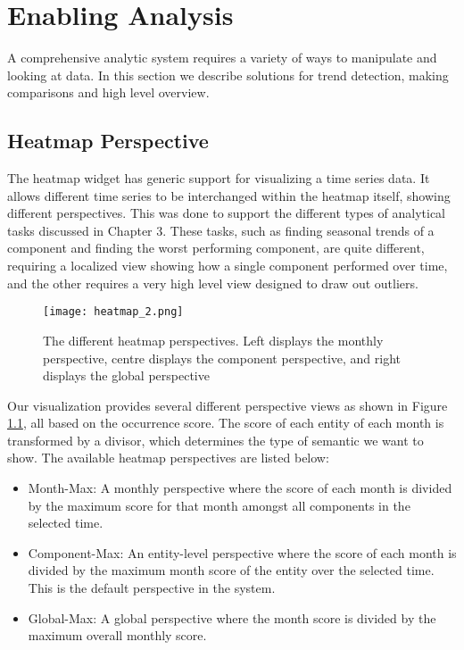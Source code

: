 %
\chapter{Enabling Analysis}
A comprehensive analytic system requires a variety of ways to manipulate and
looking at data. In this section we describe solutions for trend detection,
making comparisons and high level overview.
 

\section{Heatmap Perspective}
The heatmap widget has generic support for visualizing a time series data. It 
allows different time series to be interchanged within the heatmap itself, showing 
different perspectives. This was done to support the different types of
analytical tasks discussed in Chapter 3. These tasks, such as
finding seasonal trends of a component and finding the worst performing
component, are quite different, requiring a localized view showing how a
single component performed over time, and the other requires a very high level
view designed to draw out outliers.

	\begin{figure} 
	 \centering  
	 \texttt{[image: heatmap\_2.png]}
	 \caption[Heatmap Perspectives]{The different heatmap perspectives. Left
	 displays the monthly perspective, centre displays the component perspective, and right displays the
	 global perspective}
	 \label{figure:heatmap}
	\end{figure}


Our visualization provides several different perspective views as shown in
Figure \ref{figure:heatmap}, all based on the occurrence score. The score of
each entity of each month is transformed by a divisor, which determines the
type of semantic we want to show. The available heatmap perspectives are listed below:

\begin{itemize} [noitemsep]
  \item Month-Max: A monthly perspective where the score of each month is 
  divided by the maximum score for that month amongst all components in the selected time.
  
  \item Component-Max: An entity-level perspective where the score of
  each month is divided by the maximum month score of the entity over the
  selected time. This is the default perspective in the system.
  
  \item Global-Max: A global perspective where the month score is divided by the
  maximum overall monthly score.
\end{itemize}
 
